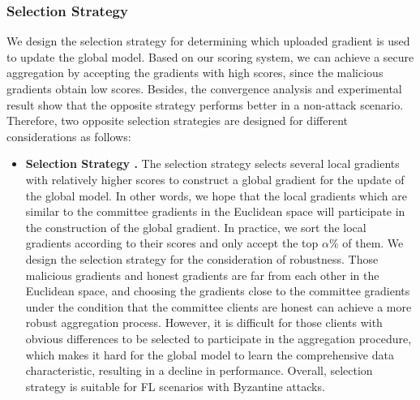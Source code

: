 \documentclass[10pt,journal,compsoc]{IEEEtran}
\begin{document}
\subsubsection{Selection Strategy}
\label{selection}

We design the selection strategy for determining which uploaded gradient is used to update the global model. Based on our scoring system, we can achieve a secure aggregation by accepting the gradients with high scores, since the malicious gradients obtain low scores. Besides, the convergence analysis and experimental result show that the opposite strategy performs better in a non-attack scenario. Therefore, two opposite selection strategies are designed for different considerations as follows:  

\begin{itemize}
\item \textbf{Selection Strategy \uppercase\expandafter{}.} The selection strategy \uppercase\expandafter{} selects several local gradients with relatively higher scores to construct a global gradient for the update of the global model. In other words, we hope that the local gradients which are similar to the committee gradients in the Euclidean space will participate in the construction of the global gradient. In practice, we sort the local gradients according to their scores and only accept the top $\alpha\%$ of them. We design the selection strategy for the consideration of robustness. Those malicious gradients and honest gradients are far from each other in the Euclidean space, and choosing the gradients close to the committee gradients under the condition that the committee clients are honest can achieve a more robust aggregation process. However, it is difficult for those clients with obvious differences to be selected to participate in the aggregation procedure, which makes it hard for the global model to learn the comprehensive data characteristic, resulting in a decline in performance. Overall, selection strategy \uppercase\expandafter{} is suitable for FL scenarios with Byzantine attacks. 

\end{itemize}
\end{document}
